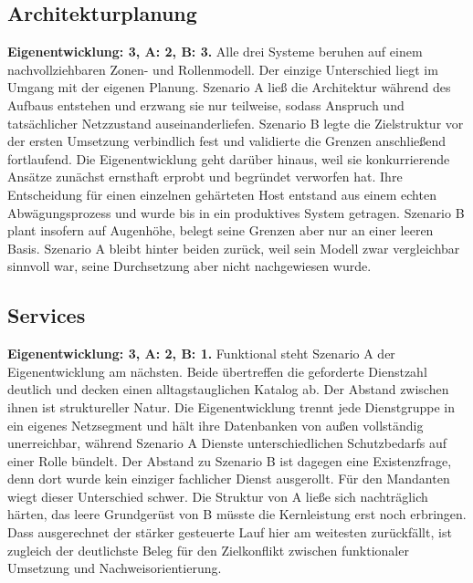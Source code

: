 {\subsection{Architekturplanung}
\textbf{Eigenentwicklung: 3, A: 2, B: 3.} Alle drei Systeme beruhen auf einem nachvollziehbaren Zonen- und Rollenmodell. Der einzige Unterschied liegt im Umgang mit der eigenen Planung. 
Szenario A ließ die Architektur während des Aufbaus entstehen und erzwang sie nur teilweise, sodass Anspruch und tatsächlicher Netzzustand auseinanderliefen. 
Szenario B legte die Zielstruktur vor der ersten Umsetzung verbindlich fest und validierte die Grenzen anschließend fortlaufend. 
Die Eigenentwicklung geht darüber hinaus, weil sie konkurrierende Ansätze zunächst ernsthaft erprobt und begründet verworfen hat. Ihre Entscheidung für einen einzelnen gehärteten Host entstand aus einem echten
Abwägungsprozess und wurde bis in ein produktives System getragen. 
Szenario B plant insofern auf Augenhöhe, belegt seine Grenzen aber nur an einer leeren Basis. 
Szenario A bleibt hinter beiden zurück, weil sein Modell zwar vergleichbar sinnvoll war, seine Durchsetzung aber nicht nachgewiesen wurde.\cite{runbookA,selfauditA,masterplanB,validatornotesB}

\subsection{Services}
\textbf{Eigenentwicklung: 3, A: 2, B: 1.} Funktional steht Szenario A der Eigenentwicklung am nächsten. Beide übertreffen die geforderte Dienstzahl deutlich und decken einen alltagstauglichen Katalog ab. Der Abstand zwischen ihnen ist struktureller Natur. 
Die Eigenentwicklung trennt jede Dienstgruppe in ein eigenes Netzsegment und hält ihre Datenbanken von außen vollständig unerreichbar, während Szenario A Dienste unterschiedlichen Schutzbedarfs auf
einer Rolle bündelt. 
Der Abstand zu Szenario B ist dagegen eine Existenzfrage, denn dort wurde kein einziger fachlicher Dienst ausgerollt. 
Für den Mandanten wiegt dieser Unterschied schwer. Die Struktur von A ließe sich nachträglich
härten, das leere Grundgerüst von B müsste die Kernleistung erst noch erbringen. Dass ausgerechnet der stärker gesteuerte Lauf hier am weitesten zurückfällt, ist zugleich der deutlichste Beleg für den Zielkonflikt zwischen funktionaler Umsetzung und Nachweisorientierung.\cite{runbookA,masterplanB,finalsummaryB}

}

